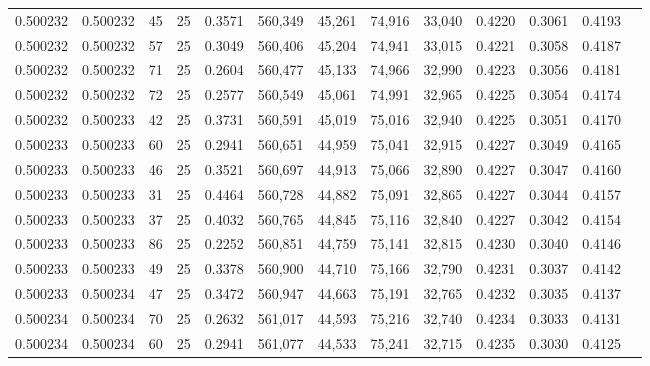 \begin{tabular}{rrrrrrrrrrrrr}
0.500232 & 0.500232 &    45 &  25 &                                     0.3571 & 560,349 &  45,261 &  74,916 &  33,040 & 0.4220 & 0.3061 & 0.4193 \\
0.500232 & 0.500232 &    57 &  25 &                                     0.3049 & 560,406 &  45,204 &  74,941 &  33,015 & 0.4221 & 0.3058 & 0.4187 \\
0.500232 & 0.500232 &    71 &  25 &                                     0.2604 & 560,477 &  45,133 &  74,966 &  32,990 & 0.4223 & 0.3056 & 0.4181 \\
0.500232 & 0.500232 &    72 &  25 &                                     0.2577 & 560,549 &  45,061 &  74,991 &  32,965 & 0.4225 & 0.3054 & 0.4174 \\
0.500232 & 0.500233 &    42 &  25 &                                     0.3731 & 560,591 &  45,019 &  75,016 &  32,940 & 0.4225 & 0.3051 & 0.4170 \\
0.500233 & 0.500233 &    60 &  25 &                                     0.2941 & 560,651 &  44,959 &  75,041 &  32,915 & 0.4227 & 0.3049 & 0.4165 \\
0.500233 & 0.500233 &    46 &  25 &                                     0.3521 & 560,697 &  44,913 &  75,066 &  32,890 & 0.4227 & 0.3047 & 0.4160 \\
0.500233 & 0.500233 &    31 &  25 &                                     0.4464 & 560,728 &  44,882 &  75,091 &  32,865 & 0.4227 & 0.3044 & 0.4157 \\
0.500233 & 0.500233 &    37 &  25 &                                     0.4032 & 560,765 &  44,845 &  75,116 &  32,840 & 0.4227 & 0.3042 & 0.4154 \\
0.500233 & 0.500233 &    86 &  25 &                                     0.2252 & 560,851 &  44,759 &  75,141 &  32,815 & 0.4230 & 0.3040 & 0.4146 \\
0.500233 & 0.500233 &    49 &  25 &                                     0.3378 & 560,900 &  44,710 &  75,166 &  32,790 & 0.4231 & 0.3037 & 0.4142 \\
0.500233 & 0.500234 &    47 &  25 &                                     0.3472 & 560,947 &  44,663 &  75,191 &  32,765 & 0.4232 & 0.3035 & 0.4137 \\
0.500234 & 0.500234 &    70 &  25 &                                     0.2632 & 561,017 &  44,593 &  75,216 &  32,740 & 0.4234 & 0.3033 & 0.4131 \\
0.500234 & 0.500234 &    60 &  25 &                                     0.2941 & 561,077 &  44,533 &  75,241 &  32,715 & 0.4235 & 0.3030 & 0.4125 \\

\end{tabular}
